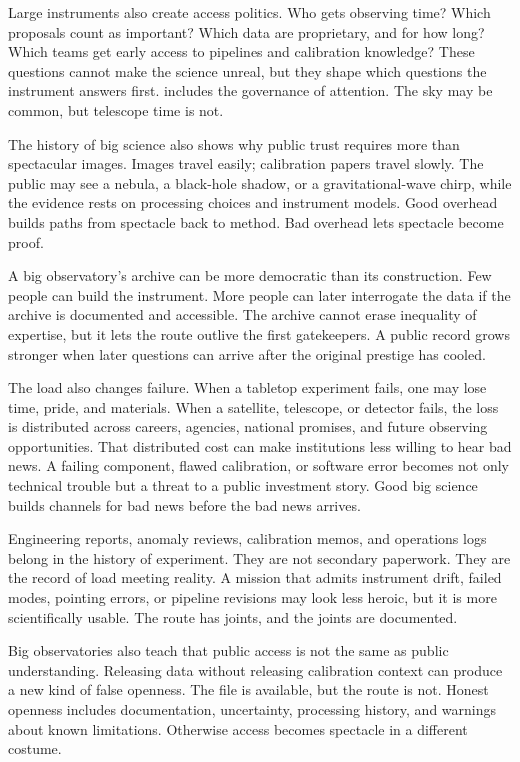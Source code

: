 Large instruments also create access politics. Who gets observing time? Which
proposals count as important? Which data are proprietary, and for how long?
Which teams get early access to pipelines and calibration knowledge? These
questions cannot make the science unreal, but they shape which questions the
instrument answers first.  includes the governance of attention.
The sky may be common, but telescope time is not.

The history of big science also shows why public trust requires more than
spectacular images. Images travel easily; calibration papers travel slowly.
The public may see a nebula, a black-hole shadow, or a gravitational-wave
chirp, while the evidence rests on processing choices and instrument models.
Good overhead builds paths from spectacle back to method. Bad overhead lets
spectacle become proof.

A big observatory's archive can be more democratic than its construction. Few
people can build the instrument. More people can later interrogate the data if
the archive is documented and accessible. The archive cannot erase inequality
of expertise, but it lets the route outlive the first gatekeepers. A public
record grows stronger when later questions can arrive after the original
prestige has cooled.

The load also changes failure. When a tabletop experiment fails, one may lose
time, pride, and materials. When a satellite, telescope, or detector fails,
the loss is distributed across careers, agencies, national promises, and
future observing opportunities. That distributed cost can make institutions
less willing to hear bad news. A failing component, flawed calibration, or
software error becomes not only technical trouble but a threat to a public
investment story. Good big science builds channels for bad news before the
bad news arrives.

Engineering reports, anomaly reviews, calibration memos, and operations logs
belong in the history of experiment. They are not secondary paperwork. They are
the record of load meeting reality. A mission that admits
instrument drift, failed modes, pointing errors, or pipeline revisions may
look less heroic, but it is more scientifically usable. The route has joints,
and the joints are documented.

Big observatories also teach that public access is not the same as public
understanding. Releasing data without releasing calibration context can
produce a new kind of false openness. The file is available, but the route is
not. Honest openness includes documentation, uncertainty, processing history,
and warnings about known limitations. Otherwise access becomes spectacle in a
different costume.

